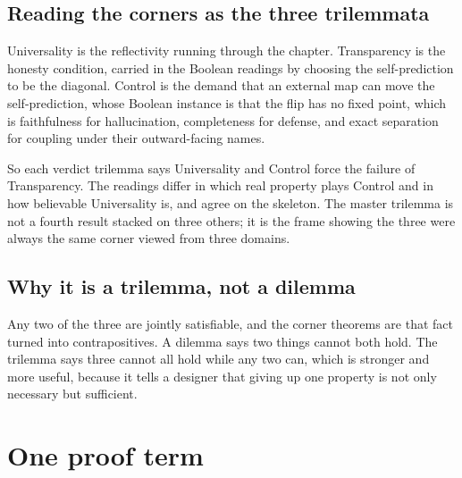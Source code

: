 \documentclass{memoir}
\begin{document}
\subsection{Reading the corners as the three trilemmata}\label{Two--Schemas--of--Impossibility-005F-005F-005F--Machine--Checked--Limits--of--Trustworthy--Machine--Learning-005F-005F-005F--and--Why--They--Tighten--with--Capability----Three--Trilemmata-005F-005F-005F--One--Theorem----The--Master--Trilemma----Reading--the--corners--as--the--three--trilemmata}

Universality is the reflectivity running through the chapter. Transparency is
the honesty condition, carried in the Boolean readings by choosing the
self-prediction to be the diagonal. Control is the demand that an external map
can move the self-prediction, whose Boolean instance is that the flip has no
fixed point, which is faithfulness for hallucination, completeness for defense,
and exact separation for coupling under their outward-facing names.

So each verdict trilemma says Universality and Control force the failure of
Transparency. The readings differ in which real property plays Control and in
how believable Universality is, and agree on the skeleton. The master trilemma
is not a fourth result stacked on three others; it is the frame showing the
three were always the same corner viewed from three domains.



\subsection{Why it is a trilemma, not a dilemma}\label{Two--Schemas--of--Impossibility-005F-005F-005F--Machine--Checked--Limits--of--Trustworthy--Machine--Learning-005F-005F-005F--and--Why--They--Tighten--with--Capability----Three--Trilemmata-005F-005F-005F--One--Theorem----The--Master--Trilemma----Why--it--is--a--trilemma-005F-005F-005F--not--a--dilemma}

Any two of the three are jointly satisfiable, and the corner theorems are that
fact turned into contrapositives. A dilemma says two things cannot both hold.
The trilemma says three cannot all hold while any two can, which is stronger and
more useful, because it tells a designer that giving up one property is not only
necessary but sufficient.



\section{One proof term}\label{Two--Schemas--of--Impossibility-005F-005F-005F--Machine--Checked--Limits--of--Trustworthy--Machine--Learning-005F-005F-005F--and--Why--They--Tighten--with--Capability----Three--Trilemmata-005F-005F-005F--One--Theorem----One--proof--term}
\end{document}
